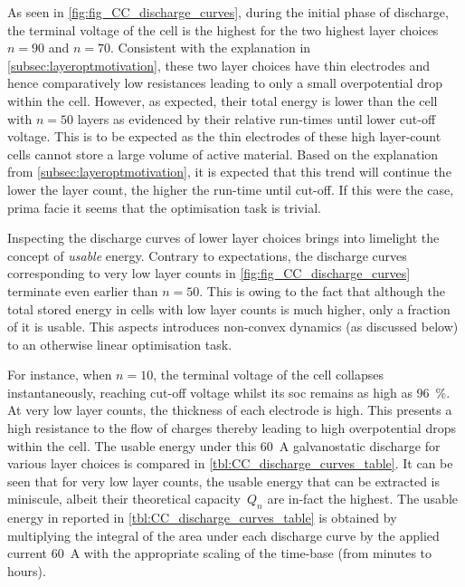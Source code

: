 As  seen  in \cref{fig:fig_CC_discharge_curves},  during  the  initial phase  of
discharge, the terminal voltage  of the cell is the highest  for the two highest
layer choices  \ie{} $n  = 90$  and $n=70$. Consistent  with the  explanation in
\cref{subsec:layeroptmotivation}, these  two layer choices have  thin electrodes
and hence  comparatively low resistances  leading to only a  small overpotential
drop within the cell. However, as expected, their total energy is lower than the
cell with  $n=50$ layers as  evidenced by  their relative run-times  until lower
cut-off voltage.  This is to  be expected as the  thin electrodes of  these high
layer-count cells cannot  store a large volume of active  material. Based on the
explanation  from \cref{subsec:layeroptmotivation},  it  is  expected that  this
trend will  continue \ie{} the  lower the layer  count, the higher  the run-time
until cut-off. If this were the case, prima facie it seems that the optimisation
task is trivial.

Inspecting the discharge curves of lower layer choices brings into limelight the
concept of \emph{usable} energy. Contrary  to expectations, the discharge curves
corresponding  to very  low layer  counts in  \cref{fig:fig_CC_discharge_curves}
terminate even earlier than $n=50$. This is  owing to the fact that although the
total  stored energy  in cells  with low  layer counts  is much  higher, only  a
fraction  of it  is  usable.  This aspects  introduces  non-convex dynamics  (as
discussed below) to an otherwise linear optimisation task.

For  instance,  when $n  =  10$,  the terminal  voltage  of  the cell  collapses
instantaneously, reaching cut-off  voltage whilst its \gls{soc}  remains as high
as \SI{96}{\percent}. At very low layer  counts, the thickness of each electrode
is high. This presents a high resistance  to the flow of charges thereby leading
to  high overpotential  drops  within the  cell. The  usable  energy under  this
\SI{60}{\ampere} galvanostatic  discharge for various layer  choices is compared
in \cref{tbl:CC_discharge_curves_table}. It can be  seen that for very low layer
counts,  the usable  energy that  can be  extracted is  miniscule, albeit  their
theoretical  capacity~$Q_n$  are  in-fact  the highest.  The  usable  energy  in
\SI{}{\watthour} reported in \cref{tbl:CC_discharge_curves_table} is obtained by
multiplying the integral  of the area under each discharge  curve by the applied
current \ie{}  \SI{60}{\ampere} with  the appropriate  scaling of  the time-base
(from minutes to hours).

